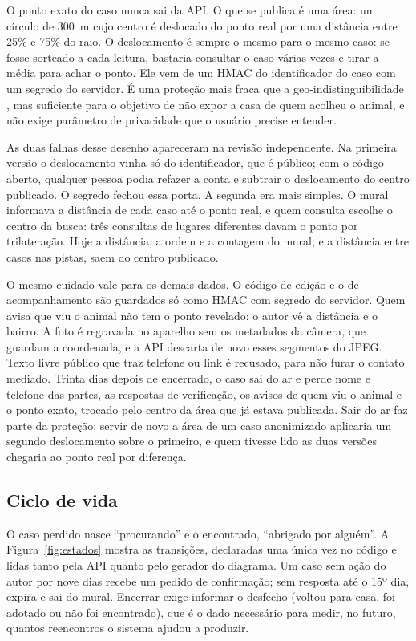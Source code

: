 \documentclass[12pt]{article}
\begin{document}
O ponto exato do caso nunca sai da API. O que se publica é uma área: um círculo
de 300~m cujo centro é deslocado do ponto real por uma distância entre 25\% e 75\%
do raio. O deslocamento é sempre o mesmo para o mesmo caso: se fosse sorteado a
cada leitura, bastaria consultar o caso várias vezes e tirar a média para achar o
ponto. Ele vem de um HMAC do identificador do caso com um segredo do servidor. É uma
proteção mais fraca que a geo-indistinguibilidade \cite{andres2013}, mas suficiente
para o objetivo de não expor a casa de quem acolheu o animal, e não exige parâmetro
de privacidade que o usuário precise entender.

As duas falhas desse desenho apareceram na revisão independente. Na primeira versão
o deslocamento vinha só do identificador, que é público; com o código aberto,
qualquer pessoa podia refazer a conta e subtrair o deslocamento do centro publicado.
O segredo fechou essa porta. A segunda era mais simples. O mural informava a distância
de cada caso até o ponto real, e quem consulta escolhe o centro da busca: três
consultas de lugares diferentes davam o ponto por trilateração. Hoje a distância, a
ordem e a contagem do mural, e a distância entre casos nas pistas, saem do centro
publicado.

O mesmo cuidado vale para os demais dados. O código de edição e o de
acompanhamento são guardados só como HMAC com segredo do servidor. Quem avisa que
viu o animal não tem o ponto revelado: o autor vê a distância e o bairro. A foto é
regravada no aparelho sem os metadados da câmera, que guardam a coordenada, e a API
descarta de novo esses segmentos do JPEG. Texto livre público que traz telefone ou
link é recusado, para não furar o contato mediado. Trinta dias depois de encerrado,
o caso sai do ar e perde nome e telefone das partes, as respostas de verificação, os
avisos de quem viu o animal e o ponto exato, trocado pelo centro da área que já
estava publicada. Sair do ar faz parte da proteção: servir de novo a área de um caso
anonimizado aplicaria um segundo deslocamento sobre o primeiro, e quem tivesse lido as
duas versões chegaria ao ponto real por diferença.

\subsection{Ciclo de vida}

O caso perdido nasce ``procurando'' e o encontrado, ``abrigado por alguém''. A
Figura~\ref{fig:estados} mostra as transições, declaradas uma única vez no código e
lidas tanto pela API quanto pelo gerador do diagrama. Um caso sem ação do autor
por nove dias recebe um pedido de confirmação; sem resposta até o 15º dia, expira e
sai do mural. Encerrar exige informar o desfecho (voltou para casa, foi adotado ou
não foi encontrado), que é o dado necessário para medir, no futuro, quantos
reencontros o sistema ajudou a produzir.
\end{document}
